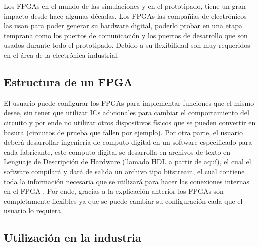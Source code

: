 \documentclass[twoside,spanish,ESP,MSc]{plantillaLabUPV}
\theoremstyle{definition}
\newcommand{\f}{FPGA }
\newcommand{\fs}{FPGAs }
\begin{document}
Los FPGAs en el mundo de las simulaciones y en el prototipado, tiene un gran impacto desde hace algunas décadas. Los FPGAs las compañías de electrónicos las usan para poder generar su hardware digital, poderlo probar en una etapa temprana como los puertos de comunicación y los puertos de desarrollo que son usados durante todo el prototipado. Debido a su flexibilidad son muy requeridos en el área de la electrónica industrial. 

\subsection{Estructura de un \f}%



El usuario puede configurar los \fs   para implementar funciones que el mismo desee, sin tener que utilizar ICs adicionales para cambiar el comportamiento del circuito y por ende no utilizar otros dispositivos físicos que se pueden convertir en basura (circuitos de prueba que fallen por ejemplo). Por otra parte, el usuario deberá desarrollar ingeniería de computo digital en un software especificado para cada fabricante, este computo digital se desarrolla en archivos de texto en Lenguaje de Descripción de Hardware (llamado HDL a partir de aquí), el cual el software compilará y dará de salida un archivo tipo bitstream, el cual contiene toda la información necesaria que se utilizará para hacer las conexiones internas en el \f. Por ende, gracias a la explicación anterior los \fs son completamente flexibles ya que se puede cambiar su configuración cada que el usuario lo requiera. \\


\subsection*{Utilización en la industria}
\end{document}
